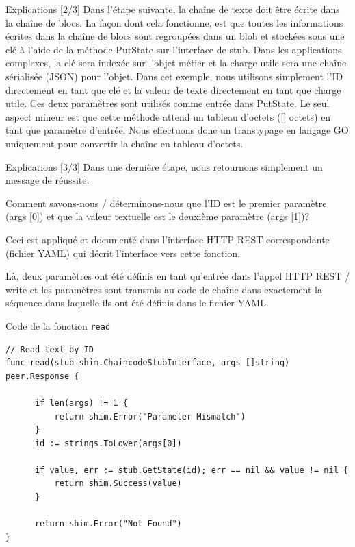 \documentclass[presentation]{beamer}
\begin{document}
\begin{frame}[label={sec:orgc32be07}]{Explications [2/3]}
Dans l'étape suivante, la chaîne de texte doit être écrite dans la chaîne de blocs. 
La façon dont cela fonctionne, est que toutes les informations écrites dans la chaîne de blocs sont 
regroupées dans un blob et stockées sous une clé à l'aide de la méthode PutState sur l'interface de stub. 
Dans les applications complexes, la clé sera indexée sur l'objet métier et la charge utile sera une chaîne  
sérialisée (JSON) pour l'objet. 
Dans cet exemple, nous utilisons simplement l'ID directement en tant que clé et la valeur de texte 
directement en tant que charge utile. Ces deux paramètres sont utilisés comme entrée dans PutState. 
Le seul aspect mineur est que cette méthode attend un tableau d'octets ([] octets) en tant que paramètre 
d'entrée. 
Nous effectuons donc un transtypage en langage GO uniquement pour convertir la chaîne en tableau d'octets.
\end{frame}

\begin{frame}[label={sec:org2104449}]{Explications [3/3]}
Dans une dernière étape, nous retournons simplement un message de réussite.

Comment savons-nous / déterminons-nous que l'ID est le premier paramètre (args [0]) et que la valeur textuelle 
est le deuxième paramètre (args [1])? 

Ceci est appliqué et documenté dans l'interface HTTP REST correspondante (fichier YAML) qui décrit l'interface 
vers cette fonction. 

Là, deux paramètres ont été définis en tant qu'entrée dans l'appel HTTP REST / write et les paramètres sont 
transmis au code de chaîne dans exactement la séquence dans laquelle ils ont été définis dans le fichier YAML.
\end{frame}
\begin{frame}[fragile,label={sec:orgf0080d2}]{Code de la fonction \texttt{read}}
 \begin{verbatim}
// Read text by ID
func read(stub shim.ChaincodeStubInterface, args []string) peer.Response {

      if len(args) != 1 {
	      return shim.Error("Parameter Mismatch")
      }
      id := strings.ToLower(args[0])

      if value, err := stub.GetState(id); err == nil && value != nil {
	      return shim.Success(value)
      }

      return shim.Error("Not Found")
}
\end{verbatim}
\end{frame}
\end{document}
